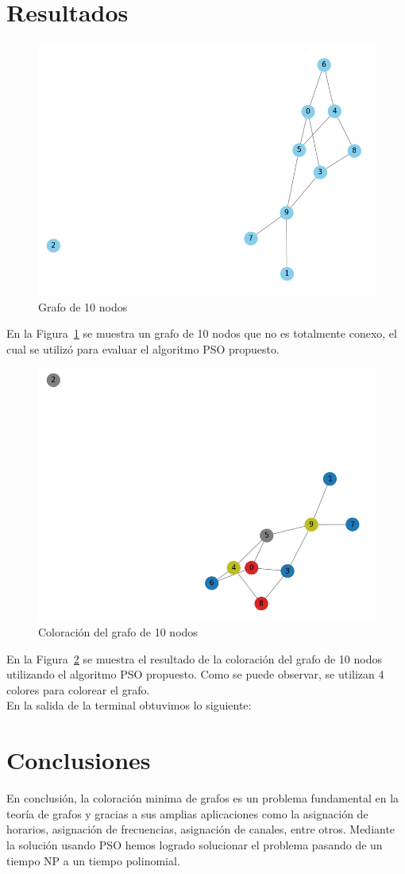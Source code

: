 \documentclass[9pt,a4paper,twoside]{tau-class/tau}
\begin{document}
\section{Resultados}
    \begin{figure}[H]
        \centering
        \includegraphics[width=0.5\columnwidth]{MCGP/graph.png}
        \caption{Grafo de 10 nodos}
        \label{fig:graph}
    \end{figure}
    En la Figura~\ref*{fig:graph} se muestra un grafo de 10 nodos que no es totalmente conexo, el cual 
    se utilizó para evaluar el algoritmo PSO propuesto.
    \begin{figure}[H]
        \centering
        \includegraphics[width=0.5\columnwidth]{MCGP/graphColored.png}
        \caption{Coloración del grafo de 10 nodos}
        \label{fig:graphColored}
    \end{figure}
    En la Figura~\ref*{fig:graphColored} se muestra el resultado de la coloración del grafo de 10 nodos utilizando el algoritmo PSO propuesto.
    Como se puede observar, se utilizan 4 colores para colorear el grafo. \\ 
    En la salida de la terminal obtuvimos lo siguiente:
    

\section{Conclusiones}
    En conclusión, la coloración minima de grafos es un problema fundamental en la teoría de grafos y gracias a sus amplias aplicaciones como
    la asignación de horarios, asignación de frecuencias, asignación de canales, entre otros. Mediante la solución usando PSO hemos logrado solucionar el problema pasando de un tiempo NP 
    a un tiempo polinomial. 

\printbibliography
\end{document}

